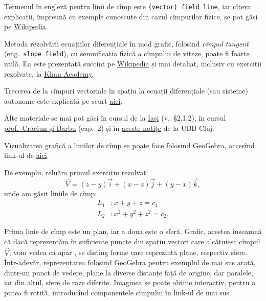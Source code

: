 \indent\indent Termenul în engleză pentru linii de cîmp este \texttt{(vector) field line}, iar cîteva
explicații, împreună cu exemple cunoscute din cazul cîmpurilor fizice, se pot
găsi pe \href{https://en.wikipedia.org/wiki/Field\_line}{Wikipedia}.

Metoda rezolvării ecuațiilor diferențiale în mod grafic, folosind \emph{cîmpul %
tangent} (eng.\ \texttt{slope field}), cu semnificația fizică a cîmpului de
viteze, poate fi foarte utilă. Ea este prezentată succint pe
\href{https://en.wikipedia.org/wiki/Slope\_field}{Wikipedia} și mai detaliat,
inclusiv cu exerciții rezolvate, la \href{https://www.khanacademy.org/math/ap-calculus-ab/ab-differential-equations-new/ab-7-3/v/creating-a-slope-field}{Khan Academy}.

Trecerea de la cîmpuri vectoriale în spațiu la ecuații diferențiale (sau sisteme)
autonome este explicată pe scurt \href{http://www.math.tamu.edu/~zelenko/308\_w3\_qual.pdf}{aici}.


\vspace{0.3cm}

Alte materiale se mai pot găsi în cursul de la \href{http://www.mec.tuiasi.ro/diverse/matematici\_speciale.pdf}{Iași} (v.\ \S2.1.2),
în cursul \href{http://www.edumanager.ro/community/documente/ecuatii\_cu\_derivate\_partiale\_de\_ordinul\_al\_doilea.pdf}{prof.\ Crăciun și Barbu} (cap.\ 2)
și în \href{https://www.yumpu.com/ro/document/read/17874390/ecuatii-diferentiale-n-forma-simetrica-integrale-prime}{aceste notițe} de la UBB Cluj.

\vspace{0.3cm}

Vizualizarea grafică a liniilor de cîmp se poate face folosind GeoGebra,
accesînd link-ul de \href{https://www.geogebra.org/m/u3xregNW}{aici}.

De exemplu, reluăm primul exercițiu rezolvat:
\[
    \vec{V} = (z - y)\vec{i} + (x - z)\vec{j} + (y - x)\vec{k},
\]
unde am găsit liniile de cîmp:
\begin{align*}
    L_1 &: x + y + z = c_1 \\
    L_2 &: x^2 + y^2 + z^2 = c_2.
\end{align*}

Prima linie de cîmp este un plan, iar a doua este o sferă. Grafic, acestea
înseamnă că dacă reprezentăm în suficiente puncte din spațiu vectori
care alcătuiesc cîmpul $ \vec{V} $, vom vedea că apar , se disting
forme care reprezintă plane, respectiv sfere. Într-adevăr, reprezentarea
folosind GeoGebra pentru exemplul de mai sus arată, dintr-un punct de vedere,
plane la diverse distanțe față de origine, dar paralele,
iar din altul, sfere de raze diferite. Imaginea se poate obține interactiv,
pentru a putea fi rotită, introducînd componentele cîmpului în link-ul de
mai sus.

